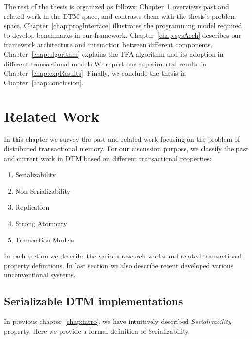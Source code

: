 \documentclass[12pt,english]{report}
\begin{document}
The rest of the thesis is organized as follows: Chapter~\ref{chap:relWork} overviews past and related work in the DTM space, and contrasts them with the thesis's problem space. Chapter~\ref{chap:progInterface} illustrates the programming model required to develop benchmarks in our framework. Chapter~\ref{chap:sysArch} describes our framework architecture and interaction between different components. Chapter~\ref{chap:algorithm} explains the TFA algorithm and its adoption in different transactional models.We report our experimental results in Chapter~\ref{chap:expResults}. Finally, we conclude the thesis in Chapter~\ref{chap:conclusion}.

\chapter{Related Work}\label{chap:relWork}

In this chapter we survey the past and related work focusing on the problem of distributed transactional memory. For our discussion purpose, we classify the past and current work in DTM based on different transactional properties:

\begin{enumerate}
\item Serializability
\item Non-Serializability 
\item Replication 
\item Strong Atomicity
\item Transaction Models
\end{enumerate}

In each section we describe the various research works and related transactional property definitions. In last section we also describe recent developed various unconventional systems.

\section{Serializable DTM implementations}

In previous chapter~\ref{chap:intro}, we have intuitively described \textit{Serializability} property. Here we provide a formal definition of Serializability. 
\end{document}
